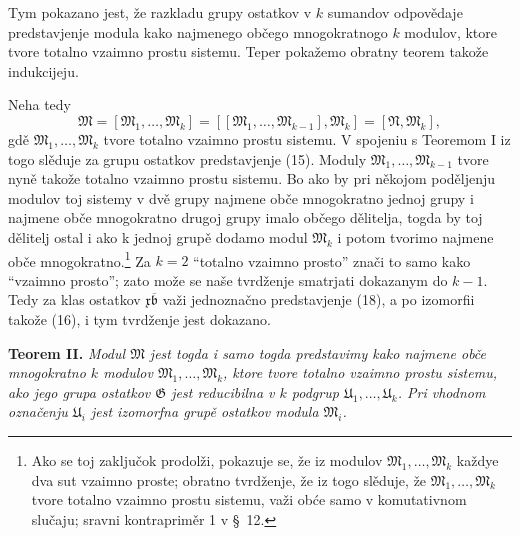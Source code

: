 \documentclass[11pt]{article}
\providecommand{\mM}{\mathfrak M}
\providecommand{\mN}{\mathfrak N}
\providecommand{\mG}{\mathfrak G}
\providecommand{\mU}{\mathfrak U}
\providecommand{\mb}{\mathfrak b}
\providecommand{\mx}{\mathfrak x}
\begin{document}
Tym pokazano jest, že razkladu grupy ostatkov v \(k\) sumandov odpovědaje predstavjenje modula kako najmenego občego mnogokratnogo \(k\) modulov, ktore tvore totalno vzaimno prostu sistemu. Teper pokažemo obratny teorem takože indukcijeju.

Neha tedy
\[
 \mM=[\mM_1,\ldots,\mM_k]=[[\mM_1,\ldots,\mM_{k-1}],\mM_k]=[\mN,\mM_k],
\]
gdě \(\mM_1,\ldots,\mM_k\) tvore totalno vzaimno prostu sistemu. V spojeniu s Teoremom I iz togo slěduje za grupu ostatkov predstavjenje (15). Moduly \(\mM_1,\ldots,\mM_{k-1}\) tvore nyně takože totalno vzaimno prostu sistemu. Bo ako by pri někojom poděljenju modulov toj sistemy v dvě grupy najmene obče mnogokratno jednoj grupy i najmene obče mnogokratno drugoj grupy imalo občego dělitelja, togda by toj dělitelj ostal i ako k jednoj grupě dodamo modul \(\mM_k\) i potom tvorimo najmene obče mnogokratno.\footnote{Ako se toj zaključok prodolži, pokazuje se, že iz modulov \(\mM_1,\ldots,\mM_k\) každye dva sut vzaimno proste; obratno tvrdženje, že iz togo slěduje, že \(\mM_1,\ldots,\mM_k\) tvore totalno vzaimno prostu sistemu, važi obće samo v komutativnom slučaju; sravni kontrapriměr 1 v \S~12.} Za \(k=2\) ``totalno vzaimno prosto'' znači to samo kako ``vzaimno prosto''; zato može se naše tvrdženje smatrjati dokazanym do \(k-1\). Tedy za klas ostatkov \(\mx\overline{\mb}\) važi jednoznačno predstavjenje (18), a po izomorfii takože (16), i tym tvrdženje jest dokazano.

\textbf{Teorem II.} \textit{Modul \(\mM\) jest togda i samo togda predstavimy kako najmene obče mnogokratno \(k\) modulov \(\mM_1,\ldots,\mM_k\), ktore tvore totalno vzaimno prostu sistemu, ako jego grupa ostatkov \(\mG\) jest reducibilna v \(k\) podgrup \(\mU_1,\ldots,\mU_k\). Pri vhodnom označenju \(\mU_i\) jest izomorfna grupě ostatkov modula \(\mM_i\).}
\end{document}
